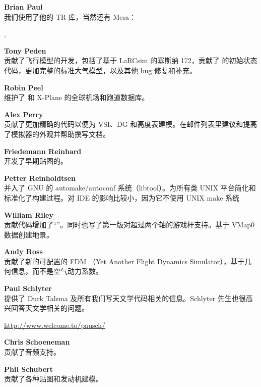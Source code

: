 \noindent \textbf{Brian Paul}\\
我们使用了他的 TR 库，当然还有 Mesa：

 , 
 \medskip

\noindent \textbf{Tony Peden}\\
贡献了飞行模型的开发，包括了基于 LaRCsim 的塞斯纳 172，贡献了 \JSBSim 的初始状态代码，更加完整的标准大气模型，以及其他 bug 修复和补充。
  \medskip

\noindent \textbf{Robin Peel}\\
维护了 \FlightGear{} 和 X-Plane 的全球机场和跑道数据库。
 \medskip

\noindent \textbf{Alex Perry}\\
贡献了更加精确的代码以便为 VSI、DG 和高度表建模。在邮件列表里建议和提高了模拟器的外观并帮助撰写文档。
 \medskip

\noindent \textbf{Friedemann Reinhard}\\
开发了早期贴图的。
 \medskip

\noindent \textbf{Petter Reinholdtsen}\\
并入了 GNU 的 automake/autoconf 系统（libtool）。为所有类 UNIX 平台简化和标准化了构建过程。对 IDE 的影响比较小，因为它不使用 UNIX make 系统
 \medskip

\noindent \textbf{William Riley}\\
贡献代码增加了“”。同时也写了第一版对超过两个轴的游戏杆支持。基于 VMap0 数据创建地景。
 \medskip

\noindent \textbf{Andy Ross}\\
贡献了新的可配置的 FDM \YASim{}（Yet Another Flight Dynamics Simulator），基于几何信息，而不是空气动力系数。
 \medskip

\noindent \textbf{Paul Schlyter}\\
提供了 Durk Talsma 及所有我们写天文学代码相关的信息。Schlyter 先生也很高兴回答天文学相关的问题。
  \medskip
  
 \href{http://www.welcome.to/pausch/}{http://www.welcome.to/pausch/}
 \medskip

\noindent \textbf{Chris Schoeneman}\\
贡献了音频支持。
 \medskip

\noindent \textbf{Phil Schubert}\\
贡献了各种贴图和发动机建模。
   \medskip


